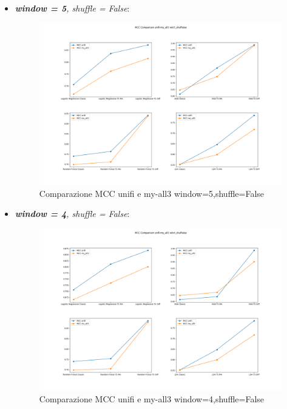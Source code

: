 \begin{itemize}
    \newpage
    \item \textit{\textbf{window = 5}, shuffle = False}:
    \begin{figure}[H]
    \centering
    \includegraphics[width=0.94\linewidth]{MCC Comparison Uni-All3 win5_shufFalse.png}
    \caption{Comparazione MCC unifi e my-all3 window=5,shuffle=False}
    \label{fig:enter-label}
    \end{figure}

    \item \textit{\textbf{window = 4}, shuffle = False}:
    \begin{figure}[H]
    \centering
    \includegraphics[width=0.94\linewidth]{MCC Comparison Uni-All3 win4_shufFalse.png}
    \caption{Comparazione MCC unifi e my-all3 window=4,shuffle=False}
    \label{fig:enter-label}
    \end{figure}


\end{itemize}

